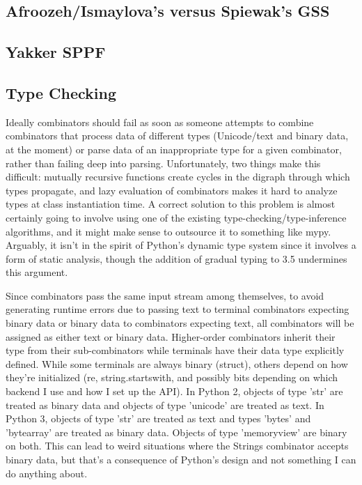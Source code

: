\documentclass[12pt]{article}
\begin{document}
\subsection{Afroozeh/Ismaylova's versus Spiewak's GSS}
\label{sec:gss_details}


\subsection{Yakker SPPF}
\label{sec:yakker_sppf}


\subsection{Type Checking}
\label{sec:type_checking}

Ideally combinators should fail as soon as someone attempts to combine
combinators that process data of different types (Unicode/text and
binary data, at the moment) or parse data of an inappropriate type for
a given combinator, rather than failing deep into parsing.
Unfortunately, two things make this difficult: mutually recursive
functions create cycles in the digraph through which types propagate,
and lazy evaluation of combinators makes it hard to analyze types at
class instantiation time.  A correct solution to this problem is
almost certainly going to involve using one of the existing
type-checking/type-inference algorithms, and it might make sense to
outsource it to something like mypy.  Arguably, it isn't in the spirit
of Python's dynamic type system since it involves a form of static
analysis, though the addition of gradual typing to 3.5 undermines this
argument.

Since combinators pass the same input stream among themselves, to
avoid generating runtime errors due to passing text to terminal
combinators expecting binary data or binary data to combinators
expecting text, all combinators will be assigned as either text or
binary data.  Higher-order combinators inherit their type from their
sub-combinators while terminals have their data type explicitly
defined.  While some terminals are always binary (struct), others
depend on how they're initialized (re, string.startswith, and possibly
bits depending on which backend I use and how I set up the API).  In
Python 2, objects of type 'str' are treated as binary data and objects
of type 'unicode' are treated as text.  In Python 3, objects of type
'str' are treated as text and types 'bytes' and 'bytearray' are
treated as binary data.  Objects of type 'memoryview' are binary on
both.  This can lead to weird situations where the Strings combinator
accepts binary data, but that's a consequence of Python's design and
not something I can do anything about.
\end{document}
